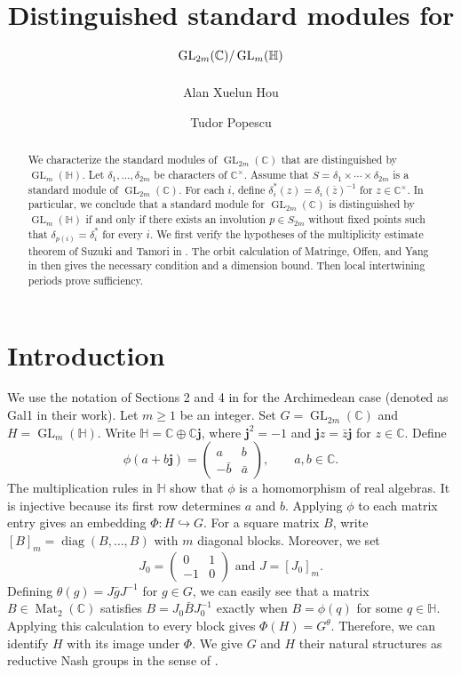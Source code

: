 \documentclass[11pt]{amsart}
\title[Distinguished standard modules in case (Gal1)]{Distinguished standard modules for $\GL_{2m}(\mathbb{C})/\GL_{m}(\mathbb{H})$}
\author{Alan Xuelun Hou}
\author{Tudor Popescu}
\date{}
\newcommand{\C}{\mathbb C}
\newcommand{\HH}{\mathbb H}
\DeclareMathOperator{\GL}{GL}
\DeclareMathOperator{\diag}{diag}
\numberwithin{equation}{section}
\begin{document}
\begin{abstract}
We characterize the standard modules of $\GL_{2m}(\C)$ that
are distinguished by $\GL_m(\HH)$. Let $\delta_1,\dots, \delta_{2m}$ be characters of $\mathbb{C}^\times$. Assume that $S = \delta_1 \times \cdots \times \delta_{2m}$ is a standard module of $\GL_{2m}(\mathbb{C})$. For each $i$, define ${\delta_i^*} (z) = \delta_i(\overline{z})^{-1}$ for $ z \in \mathbb{C}^\times$. In particular, we conclude that a standard module for $\GL_{2m}(\mathbb{C})$ is distinguished by $\GL_{m}(\mathbb{H})$ if and only if there
exists an involution $p\in S_{2m}$ without fixed points such that
$\delta_{p(i)}=\delta_i^*$ for every $i$.
We first verify the hypotheses of the multiplicity estimate theorem of Suzuki
and Tamori in \cite{ST}.
The orbit calculation of Matringe, Offen, and Yang in \cite{MOYglobal} then gives the necessary condition and a dimension bound.
Then local intertwining periods prove sufficiency.
\end{abstract}
\maketitle

\section{Introduction}

We use the notation of Sections 2 and 4 in \cite{MOYglobal} for
the Archimedean case (denoted as Gal1 in their work).
Let $m\ge1$ be an integer.
Set $G=\GL_{2m}(\C)$ and $H=\GL_m(\HH)$.
Write $\HH=\C\oplus\C\mathbf j$, where $\mathbf j^2=-1$ and
$\mathbf jz=\bar z\mathbf j$ for $z\in\C$.
Define
\[
 \phi(a+b\mathbf j)=
 \begin{pmatrix}a&b\\-\bar b&\bar a\end{pmatrix},
 \qquad a,b\in\C.
\]
The multiplication rules in $\HH$ show that $\phi$ is a
homomorphism of real algebras.
It is injective because its first row determines $a$ and $b$.
Applying $\phi$ to each matrix entry gives an embedding
$\Phi:H\hookrightarrow G$. For a square matrix $B$, write $[B]_m=\diag(B,\ldots,B)$ with $m$ diagonal blocks.
Moreover, we set $$J_0=\begin{pmatrix}0&1\\-1&0\end{pmatrix} \text{ and } J=[J_0]_m.$$
Defining $\theta(g)=J\bar gJ^{-1}$ for $g\in G$, we can easily see that
a matrix $B\in\operatorname{Mat}_2(\C)$ satisfies
$B=J_0\bar BJ_0^{-1}$ exactly when $B=\phi(q)$ for some
$q\in\HH$. Applying this calculation to every block gives $\Phi(H)=G^\theta$.
Therefore, we can identify $H$ with its image under $\Phi$.
We give $G$ and $H$ their natural structures as reductive Nash
groups in the sense of \cite{Sun2015}.
\end{document}
